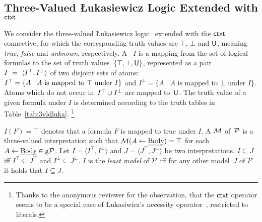 \documentclass[12pt]{article}
\begin{document}
\subsection{Three-Valued {\L}ukasiewicz Logic Extended with $\mathsf{ctxt}$} \label{sub:3valuedL}

We consider the three-valued {\L}ukasiewicz logic~\cite{lukasiewicz:20}
extended with the $\mathsf{ctxt}$ connective, for which the
corresponding truth values are $\top$, $\bot$ and $\mathsf{U}$, meaning \textit{true}, \textit{false}
and \textit{unknown}, respectively.
A ~$I$ is a mapping from the set of
logical formulas to the set
of truth values~$\{ \mathbf{\top}, \bot, \mathsf{U}\}$, represented as a pair~$I~=~\langle I^{\mathbf{\top}},I^\bot \rangle$ of two disjoint sets of atoms:  $I^{\mathbf{\top}} =  \{A \mid A \mbox{ is mapped to } \mathbf{\top} \mbox{ under } I\}$ and $I^\bot = \{A \mid A \mbox{ is mapped to } \bot \mbox{ under } I \}$.
Atoms which do not occur in~$I^{\mathbf{\top}} \cup I^\bot$ are mapped to~$\mathsf{U}$.
The truth value of a given formula
under $I$ is determined according to the truth tables in
Table~\ref{tab:3vldluka}.
\footnote{Thanks to the
 anonymous reviewer for the observation, that the $\mathsf{ctxt}$ operator seems to be a special case of {\L}ukasiwicz's necessity operator~\cite[p. 20]{malinowski:1993}, restricted to literals.
 }
 
$I(F) = \top$ denotes that a formula $F$ is mapped to true under $I$.
A  ${\cal M}$ of~${\cal P}$ is a three-valued interpretation such that
${\cal M}(A \leftarrow \mbox{\em Body}) = \mathbf{\top}$ for each $A \leftarrow \mbox{\em Body} \in \mathsf{g}{\cal P}$.
Let $I = \langle I^\top, I^\bot \rangle$ and $J = \langle J^\top,
J^\bot \rangle$ be two interpretations.
$I \subseteq J$ iff $I^\top \subseteq J^\top$ and $I^\bot \subseteq J^\bot$. $I$ is the \textit{least model} of ${\cal P}$
iff for any other model~$J$ of ${\cal P}$ it holds that $I \subseteq J$.
\end{document}
